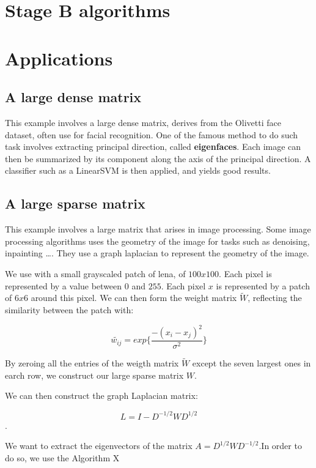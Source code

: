 \documentclass[onecolumn,12pt]{article}
\begin{document}
\section{Stage B algorithms}

\section{Applications}
\subsection{A large dense matrix}
This example involves a large dense matrix, derives from the Olivetti face
dataset, often use for facial recognition. One of the famous method to do such
task involves extracting principal direction, called \textbf{eigenfaces}. Each
image can then be summarized by its component along the axis of the principal
direction. A classifier such as a LinearSVM is then applied, and yields good
results.




\subsection{A large sparse matrix}

This example involves a large matrix that arises in image processing. Some
image processing algorithms uses the geometry of the image for tasks such as
denoising, inpainting \dots. They use a graph laplacian to represent the
geometry of the image.

We use with a small grayscaled patch of lena, of $100 x 100$. Each pixel is
represented by a value between $0$ and $255$. Each pixel $x$ is represented by
a patch of $6x6$ around this pixel. We can then form the weight matrix
$\tilde{W}$, reflecting the similarity between the patch with:

$$\tilde{w_{ij}} = exp \{ \frac{- (x_i - x_j)^2}{\sigma^2}\}$$

By zeroing all the entries of the weigth matrix $\tilde{W}$ except the seven
largest ones in earch row, we construct our large sparse matrix $W$.

We can then construct the graph Laplacian matrix:

$$L = I - D^{-1/2} W D^{1/2}$$.

We want to extract the eigenvectors of the matrix $A= D^{1/2} W D^{-1/2}$.In
order to do so, we use the Algorithm X
\end{document}
